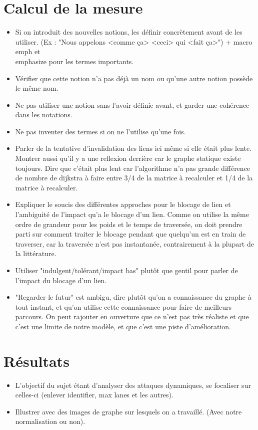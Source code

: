 \documentclass{article}
\begin{document}
\section*{Calcul de la mesure}
	\begin{itemize}
		\item Si on introduit des nouvelles notions, les définir concrètement avant de les utiliser. (Ex : "Nous appelons <comme ça> <ceci> qui <fait ça>") + macro \\emph et \\emphasize pour les termes importants.
		\item Vérifier que cette notion n'a pas déjà un nom ou qu'une autre notion possède le même nom.
		\item Ne pas utiliser une notion sans l'avoir définie avant, et garder une cohérence dans les notations.
		\item Ne pas inventer des termes si on ne l'utilise qu'une fois.
		\item Parler de la tentative d'invalidation des liens ici même si elle était plus lente. Montrer aussi qu'il y a une reflexion derrière car le graphe statique existe toujours. Dire que c'était plus lent car l'algorithme n'a pas grande différence de nombre de dijkstra à faire entre 3/4 de la matrice à recalculer et 1/4 de la matrice à recalculer.
		\item Expliquer le soucis des différentes approches pour le blocage de lien et l'ambiguité de l'impact qu'a le blocage d'un lien. Comme on utilise la même ordre de grandeur pour les poids et le temps de traversée, on doit prendre parti sur comment traiter le blocage pendant que quelqu'un est en train de traverser, car la traversée n'est pas instantanée, contrairement à la plupart de la littérature.
		\item Utiliser "indulgent/tolérant/impact bas" plutôt que gentil pour parler de l'impact du blocage d'un lien.
		\item "Regarder le futur" est ambigu, dire plutôt qu'on a connaissance du graphe à tout instant, et qu'on utilise cette connaissance pour faire de meilleurs parcours. On peut rajouter en ouverture que ce n'est pas très réaliste et que c'est une limite de notre modèle, et que c'est une piste d'amélioration.
	\end{itemize}

\section*{Résultats}
	\begin{itemize}
		\item L'objectif du sujet étant d'analyser des attaques dynamiques, se focaliser sur celles-ci (enlever identifier, max lanes et les autres).
		\item Illustrer avec des images de graphe sur lesquels on a travaillé. (Avec notre normalisation ou non).
	\end{itemize}
\end{document}
